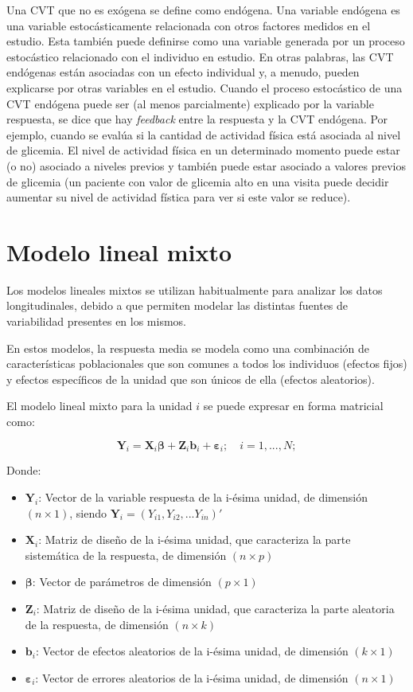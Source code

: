 \documentclass[spanish]{article}
\numberwithin{figure}{subsection}
\numberwithin{equation}{subsection}
\numberwithin{table}{subsection}
\begin{document}
Una CVT que no es exógena se define como endógena. Una variable endógena es una
variable estocásticamente relacionada con otros factores medidos en el estudio.
Esta también puede definirse como una variable generada por un proceso
estocástico relacionado con el individuo en estudio. En otras palabras, las CVT
endógenas están asociadas con un efecto individual y, a menudo, pueden
explicarse por otras variables en el estudio. Cuando el proceso estocástico de
una CVT endógena puede ser (al menos parcialmente) explicado por la variable
respuesta, se dice que hay \textit{feedback} entre la respuesta y la CVT
endógena. Por ejemplo, cuando se evalúa si la cantidad de actividad física está
asociada al nivel de glicemia. El nivel de actividad física en un determinado
momento puede estar (o no) asociado a niveles previos y también puede estar
asociado a valores previos de glicemia (un paciente con valor de glicemia alto
en una visita puede decidir aumentar su nivel de actividad fística para ver si
este valor se reduce).

\section{Modelo lineal mixto}

Los modelos lineales mixtos se utilizan habitualmente para analizar los datos
longitudinales, debido a que permiten modelar las distintas fuentes de
variabilidad presentes en los mismos.

En estos modelos, la respuesta media se modela como una combinación de
características poblacionales que son comunes a todos los individuos (efectos
fijos) y efectos específicos de la unidad que son únicos de ella (efectos
aleatorios).

El modelo lineal mixto para la unidad $i$ se puede expresar en forma matricial
como:

\[
	\bm{Y}_i = \bm{X}_i\bm{\beta} + \bm{Z}_i\bm{b}_i + \bm{\varepsilon}_i;
	\quad i = 1, ..., N;
\]

Donde:

\begin{itemize}
	\item $\bm{Y}_i$: Vector de la variable respuesta de la i-ésima unidad, de
	dimensión $(n \times 1)$, siendo $\bm{Y}_i = (Y_{i1}, Y_{i2}, ... Y_{in})'$
	\item $\bm{X}_i$: Matriz de diseño de la i-ésima unidad, que caracteriza la
	parte sistemática de la respuesta, de dimensión $(n \times p)$
	\item $\bm{\beta}$: Vector de parámetros de dimensión $(p \times 1)$
	\item $\bm{Z}_i$: Matriz de diseño de la i-ésima unidad, que caracteriza la
	parte aleatoria de la respuesta, de dimensión $(n \times k)$
	\item $\bm{b}_i$: Vector de efectos aleatorios de la i-ésima unidad, de
	dimensión $(k \times 1)$
	\item $\bm{\varepsilon}_i$: Vector de errores aleatorios de la i-ésima unidad,
	de dimensión $(n \times 1)$
\end{itemize}
\end{document}
